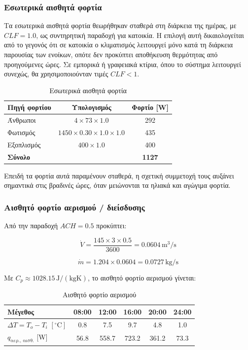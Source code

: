 \documentclass[12pt,a4paper]{article}
\begin{document}
\subsubsection{Εσωτερικά αισθητά φορτία}

Τα εσωτερικά αισθητά φορτία θεωρήθηκαν σταθερά στη διάρκεια της ημέρας, με
\(CLF=1.0\), ως συντηρητική παραδοχή για κατοικία. Η επιλογή αυτή δικαιολογείται
από το γεγονός ότι σε κατοικία ο κλιματισμός λειτουργεί μόνο κατά τη διάρκεια
παρουσίας των ενοίκων, οπότε δεν προκύπτει αποθήκευση θερμότητας από προηγούμενες
ώρες. Σε εμπορικά ή γραφειακά κτίρια, όπου το σύστημα λειτουργεί συνεχώς, θα
χρησιμοποιούνταν τιμές \(CLF < 1\).

\begin{table}[H]
\centering
\caption{Εσωτερικά αισθητά φορτία}
\begin{tabular}{lcc}
\toprule
\textbf{Πηγή φορτίου} & \textbf{Υπολογισμός} & \textbf{Φορτίο [W]} \\
\midrule
Άνθρωποι & \(4 \times 73 \times 1.0\) & 292 \\
Φωτισμός & \(1450 \times 0.30 \times 1.0 \times 1.0\) & 435 \\
Εξοπλισμός & \(400 \times 1.0\) & 400 \\
\midrule
\textbf{Σύνολο} &  & \textbf{1127} \\
\bottomrule
\end{tabular}
\end{table}

Επειδή τα φορτία αυτά παραμένουν σταθερά, η σχετική συμμετοχή τους αυξάνει σημαντικά
στις βραδινές ώρες, όταν μειώνονται τα ηλιακά και αγώγιμα φορτία.

\subsubsection{Αισθητό φορτίο αερισμού / διείσδυσης}

Από την παραδοχή \(ACH = 0.5\) προκύπτει:

\[
\dot V = \frac{145 \times 3 \times 0.5}{3600} = 0.0604\,\mathrm{m^3/s}
\]

\[
\dot m = 1.204 \times 0.0604 = 0.0727\,\mathrm{kg/s}
\]

Με \(C_p \approx 1028.15\,\mathrm{J/(kgK)}\), το αισθητό φορτίο αερισμού γίνεται:

\begin{table}[H]
\centering
\caption{Αισθητό φορτίο αερισμού}
\begin{tabular}{lccccc}
\toprule
\textbf{Μέγεθος} & \textbf{08:00} & \textbf{12:00} & \textbf{16:00} & \textbf{20:00} & \textbf{24:00} \\
\midrule
\(\Delta T = T_o - T_i\) \([\!^\circ\mathrm{C}]\) & 0.8 & 7.5 & 9.7 & 4.8 & 1.0 \\
\(q_{\text{αερ., αισθ.}}\) [W] & 56.8 & 558.7 & 723.2 & 361.2 & 73.3 \\
\bottomrule
\end{tabular}
\end{table}
\end{document}
